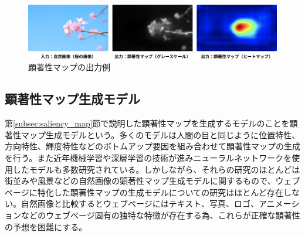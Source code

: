 \begin{figure}[H]
    \centering
    \includegraphics[width=12cm]{figures/03_ex-saliencymap.jpg}
    \caption{顕著性マップの出力例}
    \label{fig_03_ex-saliencymap}
\end{figure}

\subsection{顕著性マップ生成モデル}
\par 第\ref{subsec:saliency_map}節で説明した顕著性マップを生成するモデルのことを顕著性マップ生成モデルという。多くのモデルは人間の目と同じように位置特性、方向特性、輝度特性などのボトムアップ要因を組み合わせて顕著性マップの生成を行う。また近年機械学習や深層学習の技術が進みニューラルネットワークを使用したモデルも多数研究されている。しかしながら、それらの研究のほとんどは街並みや風景などの自然画像の顕著性マップ生成モデルに関するもので、ウェブページに特化した顕著性マップの生成モデルについての研究はほとんど存在しない。自然画像と比較するとウェブページにはテキスト、写真、ロゴ、アニメーションなどのウェブページ固有の独特な特徴が存在する為、これらが正確な顕著性の予想を困難にする。